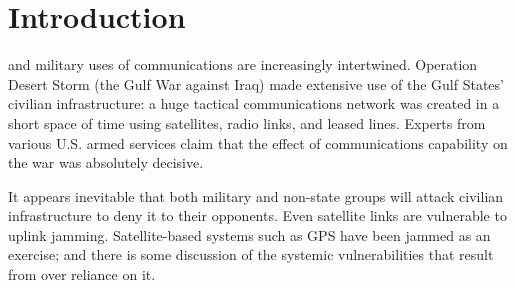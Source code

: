 \documentclass[10pt,journal,compsoc]{IEEEtran}
\begin{document}
\ifCLASSOPTIONcompsoc
{}
\else
\section{Introduction}
\label{sec:introduction}
\fi




%
%
%
%
 and military uses of communications are increasingly intertwined. Operation
Desert Storm (the Gulf War against Iraq) made extensive use of the Gulf States’ civilian
infrastructure: a huge tactical communications network was created in a short space of
time using satellites, radio links, and leased lines.
Experts from various U.S. armed services claim that the effect of communications capability on the war was absolutely
decisive.

It appears inevitable that both military and non-state groups will attack
civilian infrastructure to deny it to their opponents.
Even satellite links are
vulnerable to uplink jamming.
Satellite-based systems such as GPS have been
jammed as an exercise; and there is some discussion of the systemic vulnerabilities that
result from over reliance on it.
\end{document}
